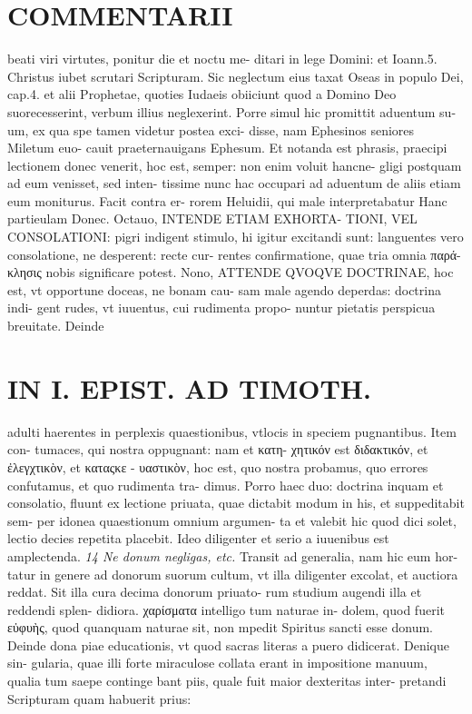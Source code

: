 \documentclass{article}
\begin{document}
\begin{pages}
\section*{COMMENTARII }
\marginpar{[ p.110 ]}\pstart beati viri virtutes, ponitur die et noctu me- ditari in lege Domini: et Ioann.5. Christus iubet scrutari Scripturam. Sic neglectum eius taxat Oseas in populo Dei, cap.4. et alii Prophetae, quoties Iudaeis obiiciunt quod a Domino Deo suorecesserint, verbum illius neglexerint.  \pend\pstart Porre simul hic promittit aduentum su- um, ex qua spe tamen videtur postea exci- disse, nam Ephesinos seniores Miletum euo- cauit praeternauigans Ephesum. Et notanda est phrasis, praecipi lectionem donec venerit, hoc est, semper: non enim voluit hancne- gligi postquam ad eum venisset, sed inten- tissime nunc hac occupari ad aduentum de aliis etiam eum moniturus. Facit contra er- rorem Heluidii, qui male interpretabatur Hanc partieulam Donec.  \pend\pstart Octauo, INTENDE ETIAM EXHORTA- TIONI, VEL CONSOLATIONI: pigri indigent stimulo, hi igitur excitandi sunt: languentes vero consolatione, ne desperent: recte cur- rentes confirmatione, quae tria omnia παρά- κλησις nobis significare potest.  \pend\pstart Nono, ATTENDE QVOQVE DOCTRINAE, hoc est, vt opportune doceas, ne bonam cau- sam male agendo deperdas: doctrina indi- gent rudes, vt iuuentus, cui rudimenta propo- nuntur pietatis perspicua breuitate. Deinde  \pend
\section*{IN I. EPIST. AD TIMOTH. }
\marginpar{[ p.111 ]}\pstart adulti haerentes in perplexis quaestionibus, vtlocis in speciem pugnantibus. Item con- tumaces, qui nostra oppugnant: nam et κατη- χητικόν est διδακτικόν, et ἐλεγχτικὸν, et καταςκε - υαστικὸν, hoc est, quo nostra probamus, quo errores confutamus, et quo rudimenta tra- dimus. Porro haec duo: doctrina inquam et consolatio, fluunt ex lectione priuata, quae dictabit modum in his, et suppeditabit sem- per idonea quaestionum omnium argumen- ta et valebit hic quod dici solet, lectio decies repetita placebit. Ideo diligenter et serio a iuuenibus est amplectenda.  \pend
\textit{14  Ne donum negligas, etc. }\pstart Transit ad generalia, nam hic eum hor- tatur in genere ad donorum suorum cultum, vt illa diligenter excolat, et auctiora reddat. Sit illa cura decima donorum priuato- rum studium augendi illa et reddendi splen- didiora. χαρίσματα intelligo tum naturae in- dolem, quod fuerit εὐφυὴς, quod quanquam naturae sit, non mpedit Spiritus sancti esse donum.  \pend\pstart Deinde dona piae educationis, vt quod sacras literas a puero didicerat. Denique sin- gularia, quae illi forte miraculose collata erant in impositione manuum, qualia tum saepe continge bant piis, quale fuit maior dexteritas inter- pretandi Scripturam quam habuerit prius:  \pend

\end{pages}
\end{document}
